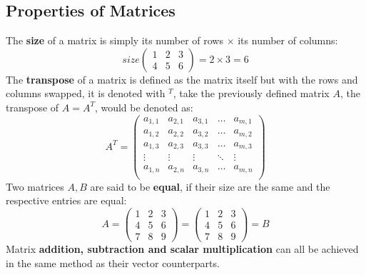 \documentclass[a4paper]{article}
\begin{document}
  \subsection{Properties of Matrices}
  The \textbf{size} of a matrix is simply its number of rows $\times$ its number of columns:
  \[
    size\begin{pmatrix}
      1 & 2 & 3 \\ 4 & 5 & 6 
    \end{pmatrix} = 2\times 3 = 6
  \]
  The \textbf{transpose} of a matrix is defined as the matrix itself but with the rows and columns swapped, it is denoted with $^T$, take the previously defined matrix $A$, the transpose of $A = A^T$, would be denoted as:
  \[
    A^T = \begin{pmatrix}
      a_{1,1} & a_{2,1} & a_{3,1}& \dots & a_{m,1} \\
      a_{1,2} & a_{2,2} & a_{3,2}&\dots & a_{m,2} \\
      a_{1,3} & a_{2,3} & a_{3,3}&\dots & a_{m,3} \\
      \vdots & \vdots & \vdots&\ddots & \vdots\\
      a_{1,n} & a_{2,n} & a_{3,n}&\dots & a_{m,n} \\
    \end{pmatrix}
  \]
  Two matrices $A,B$ are said to be \textbf{equal}, if their size are the same and the respective entries are equal:
  \[
    A = \begin{pmatrix}
      1 & 2 & 3 \\ 4 & 5 & 6 \\ 7 & 8 & 9 
    \end{pmatrix} =
    \begin{pmatrix}
      1 & 2 & 3 \\ 4 & 5 & 6 \\ 7 & 8 & 9 
    \end{pmatrix} = B
  \]
  Matrix \textbf{addition, subtraction and scalar multiplication} can all be achieved in the same method as their vector counterparts.
\end{document}
